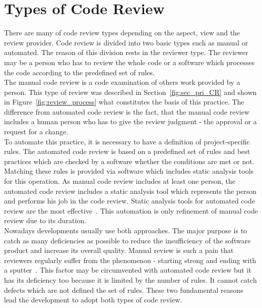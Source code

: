 \section{Types of Code Review}

There are many of code review types depending on the aspect, view and the review provider. Code review is divided into two basic types such as manual or automated. The reason of this division rests in the reviewer type. The reviewer may be a person who has to review the whole code or a software which processes the code according to the predefined set of rules.\\

The manual code review is a code examination of others work provided by a person. This type of review was described in Section~\ref{fig:sec_pri_CR} and shown in Figure~\ref{fig:review_process} what constitutes the basis of this practice. The difference from automated code review is the fact, that the manual code review includes a human person who has to give the review judgment - the approval or a request for a change.\\

To automate this practice, it is necessary to have a definition of project-specific rules. The automated code review is based on a predefined set of rules and best practices which are checked by a software whether the conditions are met or not. Matching these rules is provided via software which includes static analysis tools for this operation. As manual code review includes at least one person, the automated code review includes a static analysis tool which represents the person and performs his job in the code review. Static analysis tools for automated code review are the most effective~\cite{CodeReview_security}. This automation is only refinement of manual code review due to its duration.\\

Nowadays developments usually use both approaches. The major purpose is to catch as many deficiencies as possible to reduce the insufficiency of the software product and increase its overall quality. Manual review is such a pain that reviewers regularly suffer from the  phenomenon - starting strong and ending with a sputter~\cite{CodeReview_security}. This factor may be circumvented with automated code review but it has its deficiency too because it is limited by the number of rules. It cannot catch defects which are not defined the set of rules. These two fundamental reasons lead the development to adopt both types of code review.

